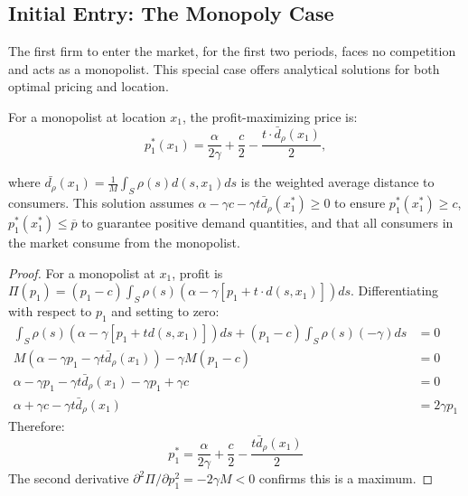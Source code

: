 \documentclass{article}
\begin{document}
\subsection*{Initial Entry: The Monopoly Case}

The first firm to enter the market, for the first two periods, faces no competition and acts as a monopolist. This special case offers analytical solutions for both optimal pricing and location.

\begin{proposition}
  \label{prop:mono_price}
  For a monopolist at location $x_1$, the profit-maximizing price is:
  \begin{equation}
    p_1^*(x_1) = \frac{\alpha}{2\gamma} + \frac{c}{2} - \frac{t \cdot \bar{d}_{\rho}(x_1)}{2},
  \end{equation}

  where $\bar{d_{\rho}}(x_1) = \frac{1}{M}\int_S \rho(s) d(s,x_1) ds$ is the weighted average distance to consumers.
  This solution assumes $\alpha - \gamma c - \gamma t \bar{d}_{\rho}(x_1^*) \geq 0$ to ensure $p_1^*(x_1^*) \geq c$, $p_1^*(x_1^*) \leq \overline{p}$ to guarantee positive demand quantities, and that all consumers in the market consume from the monopolist.
\end{proposition}

\begin{proof}
  For a monopolist at $x_1$, profit is $\Pi(p_1) = (p_1 - c) \int_S \rho(s) (\alpha - \gamma [p_1 + t \cdot d(s,x_1)]) ds$.
  Differentiating with respect to $p_1$ and setting to zero:
  \begin{align*}
    \int_S \rho(s)(\alpha - \gamma [p_1 + t d(s,x_1)])ds + (p_1 - c)\int_S \rho(s)(-\gamma)ds &= 0\\
    M(\alpha - \gamma p_1 - \gamma t \bar{d}_{\rho}(x_1)) - \gamma M(p_1 - c) &= 0\\
    \alpha - \gamma p_1 - \gamma t \bar{d}_{\rho}(x_1) - \gamma p_1 + \gamma c &= 0\\
    \alpha + \gamma c - \gamma t \bar{d}_{\rho}(x_1) &= 2\gamma p_1
  \end{align*}
  Therefore:
  \begin{equation}
    p_1^* = \frac{\alpha}{2\gamma} + \frac{c}{2} - \frac{t \bar{d}_{\rho}(x_1)}{2}
  \end{equation}
  The second derivative $\partial^2 \Pi/\partial p_1^2 = -2\gamma M < 0$ confirms this is a maximum.
\end{proof}
\end{document}
